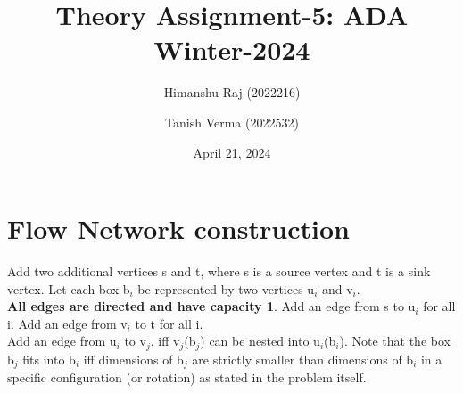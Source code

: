 \documentclass{article}
\title{Theory Assignment-5: ADA Winter-2024}
\author{Himanshu Raj (2022216) \and Tanish Verma (2022532)}
\date{April 21, 2024}
\begin{document}
\maketitle

\section{Flow Network construction}
Add two additional vertices s and t, where s is a source vertex and t is a sink vertex. Let each box b$_i$ be represented by two vertices u$_i$ and v$_i$.\\
\textbf{All edges are directed and have capacity 1}. Add an edge from s to u$_i$ for all i. Add an edge from v$_i$ to t for all i.\\
Add an edge from u$_i$ to v$_j$, iff v$_j$(b$_j$) can be nested into u$_i$(b$_i$). Note that the box b$_j$ fits into b$_i$ iff dimensions of b$_j$ are strictly smaller than dimensions of b$_i$ in a specific configuration (or rotation) as stated in the problem itself.
\end{document}
